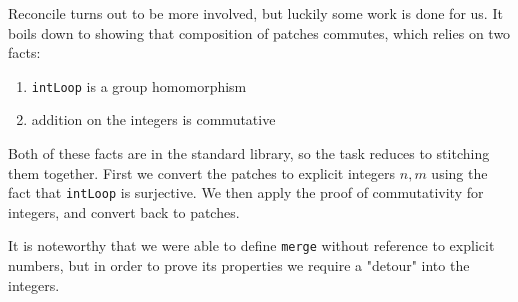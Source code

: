 Reconcile turns out to be more involved, but luckily some work is done for us.
It boils down to showing that composition of patches commutes, which relies on two facts:
\begin{enumerate}
  \item \texttt{intLoop} is a group homomorphism
  \item addition on the integers is commutative
\end{enumerate}

Both of these facts are in the standard library, so the task reduces to stitching them together.
First we convert the patches to explicit integers $n, m$ using the fact that \texttt{intLoop} is surjective.
We then apply the proof of commutativity for integers, and convert back to patches.

It is noteworthy that we were able to define \texttt{merge} without reference to explicit numbers,
but in order to prove its properties we require a "detour" into the integers.
